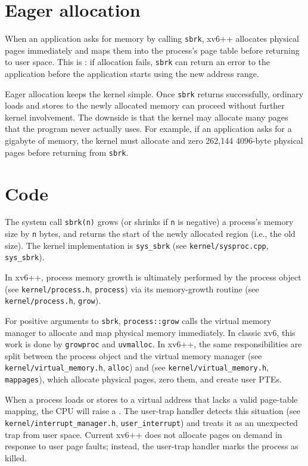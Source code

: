 \section{Eager allocation}
\label{sec:eager}

When an application asks for memory by calling \lstinline{sbrk}, xv6++
allocates physical pages immediately and maps them into the process's
page table before returning to user space. This is : if allocation fails, \lstinline{sbrk} can return an error
to the application before the application starts using the new address
range.

Eager allocation keeps the kernel simple. Once \lstinline{sbrk}
returns successfully, ordinary loads and stores to the newly allocated
memory can proceed without further kernel involvement. The downside is
that the kernel may allocate many pages that the program never actually
uses. For example, if an application asks for a gigabyte of memory, the
kernel must allocate and zero 262,144 4096-byte physical pages before
returning from \lstinline{sbrk}.

\section{Code}

The system call {\tt sbrk(n)} grows (or shrinks if {\tt n}
is negative) a process's memory size by {\tt n} bytes, and returns
the start of the newly allocated region (i.e., the old size).
The kernel implementation is \lstinline{sys_sbrk}
(see \texttt{kernel/sysproc.cpp}, \texttt{sys\_sbrk}).

In xv6++, process memory growth is ultimately performed by the process
object (see \texttt{kernel/process.h}, \texttt{process}) via its
memory-growth routine (see \texttt{kernel/process.h}, \texttt{grow}).

For positive arguments to \lstinline{sbrk}, \lstinline{process::grow}
calls the virtual memory manager to allocate and map physical memory
immediately. In classic xv6, this work is done by \lstinline{growproc}
and \lstinline{uvmalloc}. In xv6++, the same responsibilities are split
between the process object and the virtual memory manager (see
\texttt{kernel/virtual\_memory.h}, \texttt{alloc}) and (see
\texttt{kernel/virtual\_memory.h}, \texttt{mappages}), which allocate
physical pages, zero them, and create user PTEs.

When a process loads or stores to a virtual address that
lacks a valid page-table mapping, the CPU will
raise a .
The user-trap handler detects this situation
(see \texttt{kernel/interrupt\_manager.h}, \texttt{user\_interrupt})
and treats it as an unexpected trap from user space. Current xv6++
does not allocate pages on demand in response to user page faults;
instead, the user-trap handler marks the process as killed.

